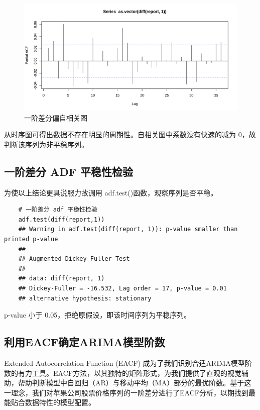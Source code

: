 \documentclass{article} %
\begin{document}
\begin{figure}[h] %
	\centering %
	\includegraphics[width=\textwidth]{pic/pacf1dif.pdf} %
	\caption{一阶差分偏自相关图} %
	\label{} %
\end{figure}
\FloatBarrier
从时序图可得出数据不存在明显的周期性。自相关图中系数没有快速的减为 0，故判断该序列为非平稳序列。

\subsection{一阶差分 ADF 平稳性检验}
为使以上结论更具说服力故调用 adf.test()函数，观察序列是否平稳。

\begin{lstlisting}
    # 一阶差分 adf 平稳性检验
    adf.test(diff(report,1))
    ## Warning in adf.test(diff(report, 1)): p-value smaller than printed p-value
    ##
    ## Augmented Dickey-Fuller Test
    ##
    ## data: diff(report, 1)
    ## Dickey-Fuller = -16.532, Lag order = 17, p-value = 0.01
    ## alternative hypothesis: stationary
\end{lstlisting}

p-value 小于 0.05，拒绝原假设，即该时间序列为平稳序列。

\subsection{利用EACF确定ARIMA模型阶数}

Extended Autocorrelation Function (EACF) 成为了我们识别合适ARIMA模型阶数的有力工具。EACF方法，以其独特的矩阵形式，为我们提供了直观的视觉辅助，帮助判断模型中自回归（AR）与移动平均（MA）部分的最优阶数。基于这一理念，我们对苹果公司股票价格序列的一阶差分进行了EACF分析，以期找到最能贴合数据特性的模型配置。
\end{document}
